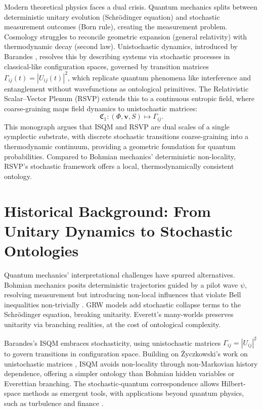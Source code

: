 \documentclass[12pt]{article}
\begin{document}
Modern theoretical physics faces a dual crisis. Quantum mechanics splits between deterministic unitary evolution (Schrödinger equation) and stochastic measurement outcomes (Born rule), creating the measurement problem. Cosmology struggles to reconcile geometric expansion (general relativity) with thermodynamic decay (second law). Unistochastic dynamics, introduced by Barandes \citep{Barandes2023}, resolves this by describing systems via stochastic processes in classical-like configuration spaces, governed by transition matrices \(\Gamma_{ij}(t) = |U_{ij}(t)|^2\), which replicate quantum phenomena like interference and entanglement without wavefunctions as ontological primitives. The Relativistic Scalar–Vector Plenum (RSVP) extends this to a continuous entropic field, where coarse-graining maps field dynamics to unistochastic matrices:
\[
\mathfrak{C}_1: (\Phi, \mathbf{v}, S) \mapsto \Gamma_{ij}.
\]
This monograph argues that ISQM and RSVP are dual scales of a single symplectic substrate, with discrete stochastic transitions coarse-graining into a thermodynamic continuum, providing a geometric foundation for quantum probabilities. Compared to Bohmian mechanics’ deterministic non-locality, RSVP’s stochastic framework offers a local, thermodynamically consistent ontology.

\section{Historical Background: From Unitary Dynamics to Stochastic Ontologies}

Quantum mechanics’ interpretational challenges have spurred alternatives. Bohmian mechanics \citep{Bohm1952} posits deterministic trajectories guided by a pilot wave \(\psi\), resolving measurement but introducing non-local influences that violate Bell inequalities non-trivially \citep{Bell1987}. GRW models \citep{Ghirardi1986} add stochastic collapse terms to the Schrödinger equation, breaking unitarity. Everett’s many-worlds \citep{Everett1957} preserves unitarity via branching realities, at the cost of ontological complexity.

Barandes’s ISQM \citep{Barandes2023} embraces stochasticity, using unistochastic matrices \(\Gamma_{ij} = |U_{ij}|^2\) to govern transitions in configuration space. Building on Życzkowski’s work on unistochastic matrices \citep{Zyczkowski1994, Zyczkowski2003}, ISQM avoids non-locality through non-Markovian history dependence, offering a simpler ontology than Bohmian hidden variables or Everettian branching. The stochastic-quantum correspondence allows Hilbert-space methods as emergent tools, with applications beyond quantum physics, such as turbulence and finance \citep{Stratonovich1963}.
\end{document}
